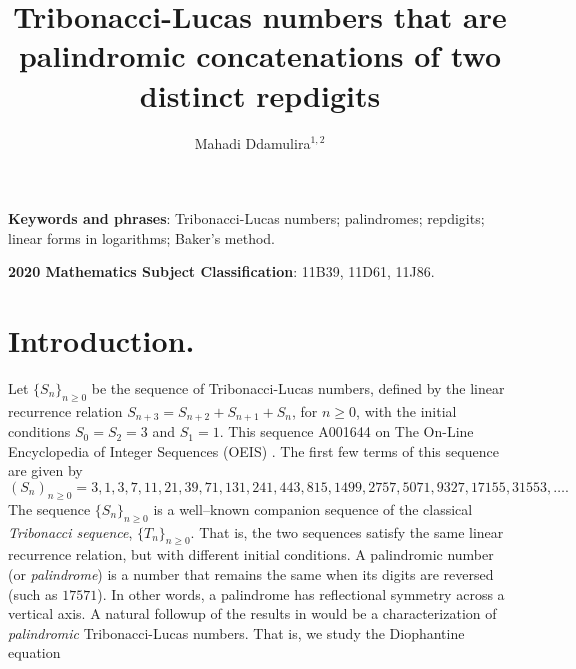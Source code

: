 \documentclass[10pt,a4paper]{article}
\author{Mahadi Ddamulira$ ^{1,2} $}
\title{Tribonacci-Lucas numbers that are palindromic concatenations of two distinct repdigits}
\date{}
\begin{document}
\maketitle


\noindent
{\bf Keywords and phrases}: Tribonacci-Lucas numbers; palindromes; repdigits; linear forms in logarithms; Baker's method.
 
\noindent
{\bf 2020 Mathematics Subject Classification}: 11B39, 11D61, 11J86.

\section{Introduction.}

\noindent Let $\{S_n\}_{n\ge 0}$ be the sequence of Tribonacci-Lucas numbers, defined by the linear recurrence relation  $S_{n+3} = S_{n+2} + S_{n+1} + S_n$, for $n \ge 0$, with the initial conditions  $S_0 =S_2= 3$ and $S_1 = 1$. This sequence A001644 on The On-Line Encyclopedia of Integer Sequences (OEIS) \cite{OEIS}.  The first few terms of this sequence are given by
\begin{equation*}
(S_n)_{n \geq 0} = 3, 1, 3, 7, 11, 21, 39, 71, 131, 241, 443, 815, 1499, 2757, 5071, 9327, 17155, 31553, \ldots.
\end{equation*}
\noindent The sequence $ \{S_n\}_{n\ge 0} $ is a well--known companion sequence of the classical {\it Tribonacci sequence}, $ \{T_n\}_{n\ge 0} $. That is, the two sequences satisfy the same linear recurrence relation, but with different initial conditions.
A palindromic number (or {\it palindrome}) is a number that remains the same when its digits are reversed (such as $17571$). In other words, a palindrome has reflectional symmetry across a vertical axis. A natural followup of the results in \cite{MD1, MD2} would be a characterization of \textit{palindromic} Tribonacci-Lucas numbers. That is, we study the Diophantine equation
\end{document}
